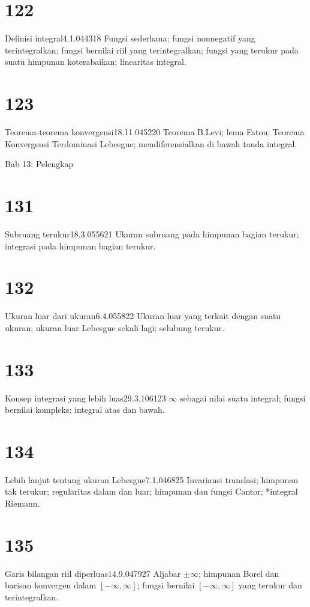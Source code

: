 \section{122}{Definisi integral}{4.1.04}{43}{18}
{Fungsi sederhana;  fungsi nonnegatif yang terintegralkan;  fungsi
bernilai riil yang terintegralkan;  fungsi yang terukur pada suatu himpunan
koterabaikan;  linearitas
integral.}

\section{123}{Teorema-teorema konvergensi}{18.11.04}{52}{20}
{Teorema B.Levi;  lema Fatou;  Teorema Konvergensi
Terdominasi Lebesgue;  mendiferensialkan di bawah tanda integral.}

\medskip

 Bab 13:  Pelengkap


\section{131}{Subruang terukur}{18.3.05}{56}{21}
{Ukuran subruang pada himpunan bagian terukur;  integrasi pada
himpunan bagian terukur.}

\section{132}{Ukuran luar dari ukuran}{6.4.05}{58}{22}
{Ukuran luar yang terkait dengan suatu ukuran;  ukuran luar Lebesgue
sekali lagi;  selubung terukur.}

\section{133}{Konsep integrasi yang lebih luas}{29.3.10}{61}{23}
{$\infty$ sebagai nilai suatu integral;  fungsi bernilai kompleks;
integral atas dan bawah.}

\section{134}{Lebih lanjut tentang ukuran Lebesgue}{7.1.04}{68}{25}
{Invariansi translasi;  himpunan tak terukur;  regularitas dalam dan luar;
himpunan dan fungsi Cantor;  *integral Riemann.}

\section{135}{Garis bilangan riil diperluas}{14.9.04}{79}{27}
{Aljabar $\pm\infty$;  himpunan Borel dan barisan konvergen
dalam $[-\infty,\infty]$;   fungsi bernilai $[-\infty,\infty]$
yang terukur dan terintegralkan.}

